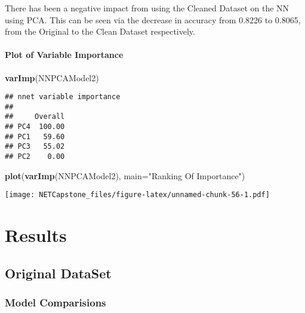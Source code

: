 \documentclass[
]{article}
\newenvironment{Shaded}{\begin{snugshade}}{\end{snugshade}}
\newcommand{\DataTypeTok}[1]{\textcolor[rgb]{0.13,0.29,0.53}{#1}}
\newcommand{\KeywordTok}[1]{\textcolor[rgb]{0.13,0.29,0.53}{\textbf{#1}}}
\newcommand{\NormalTok}[1]{#1}
\newcommand{\StringTok}[1]{\textcolor[rgb]{0.31,0.60,0.02}{#1}}
\begin{document}
There has been a negative impact from using the Cleaned Dataset on the
NN using PCA. This can be seen via the decrease in accuracy from 0.8226
to 0.8065, from the Original to the Clean Dataset respectively.

\hypertarget{plot-of-variable-importance-5}{%
\paragraph{Plot of Variable
Importance}\label{plot-of-variable-importance-5}}

\begin{Shaded}
\begin{Highlighting}[]
\KeywordTok{varImp}\NormalTok{(NNPCAModel2)}
\end{Highlighting}
\end{Shaded}

\begin{verbatim}
## nnet variable importance
## 
##     Overall
## PC4  100.00
## PC1   59.60
## PC3   55.02
## PC2    0.00
\end{verbatim}

\begin{Shaded}
\begin{Highlighting}[]
\KeywordTok{plot}\NormalTok{(}\KeywordTok{varImp}\NormalTok{(NNPCAModel2), }\DataTypeTok{main=}\StringTok{"Ranking Of Importance"}\NormalTok{)}
\end{Highlighting}
\end{Shaded}

\texttt{[image: NETCapstone\_files/figure-latex/unnamed-chunk-56-1.pdf]}

\newpage

\hypertarget{results}{%
\section{Results}\label{results}}

\hypertarget{original-dataset-7}{%
\subsection{Original DataSet}\label{original-dataset-7}}

\hypertarget{model-comparisions}{%
\subsubsection{Model Comparisions}\label{model-comparisions}}
\end{document}
